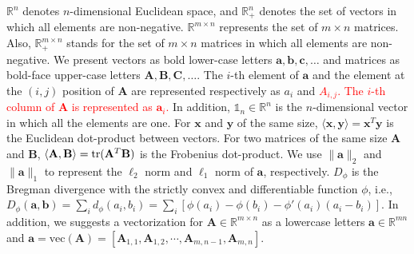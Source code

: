 \documentclass[twoside]{article}
\theoremstyle{plain}
\newcommand{\one}{\mathds{1}}
\newcommand{\mat}[1]{\mathbf{#1}}
\renewcommand{\vec}[1]{\bm{#1}}
\newcommand{\changeHK}[1]{\textcolor{red}{#1}}
\begin{document}
$\mathbb{R}^n$ denotes $n$-dimensional Euclidean space, and $\mathbb{R}^n_+$ denotes the set of vectors in which all elements are non-negative. $\mathbb{R}^{m \times n}$ represents the set of $m \times n$ matrices. Also, $\mathbb{R}^{m \times n}_+$ stands for the set of $m \times n$ matrices in which all elements are non-negative. We present vectors as bold lower-case letters $\vec{a},\vec{b},\vec{c},\dots$ and matrices as bold-face upper-case letters $\mat{A},\mat{B},\mat{C},\dots$. The $i$-th element of $\vec{a}$ and the element at the $(i,j)$ position of $\mat{A}$ are represented respectively as $a_i$ and \changeHK{${A}_{i,j}$. The $i$-th column of $\mat{A}$ is represented as $\vec{a}_i$.} In addition, $\one_n \in \mathbb{R}^n$ is the $n$-dimensional vector in which all the elements are one. For $\vec{x}$ and $\vec{y}$ of the same size, $\langle \vec{x},\vec{y} \rangle = \vec{x}^T\vec{y}$ is the Euclidean dot-product between vectors. For two matrices of the same size $\mat{A}$ and $\mat{B}$, $\langle \mat{A},\mat{B}\rangle={\rm tr}(\mat{A}^T\mat{B})$ is the Frobenius dot-product. We use $\|\vec{a}\|_2$ and $\|\vec{a}\|_1$ to represent the $\ell_2$ norm and $\ell_1$ norm of $\vec{a}$, respectively. 
$D_\phi$ is the Bregman divergence with the strictly convex and differentiable function $\phi$, i.e., $D_\phi(\vec{a},\vec{b})=\sum_{i} d_\phi(a_i, b_i)=\sum_i [\phi(a_i) - \phi(b_i) - \phi'(a_i)(a_i -b_i)]$. In addition, we suggests a vectorization for $\mat{A} \in \mathbb{R}^{m \times n}$ as a lowercase letters $\vec{a} \in \mathbb{R}^{mn}$ and $\vec{a}=\text{vec}(\mat{A})=[\mat{A}_{1,1}, \mat{A}_{1,2}, \cdots, \mat{A}_{m,n-1}, \mat{A}_{m,n}]$.
 
\end{document}
